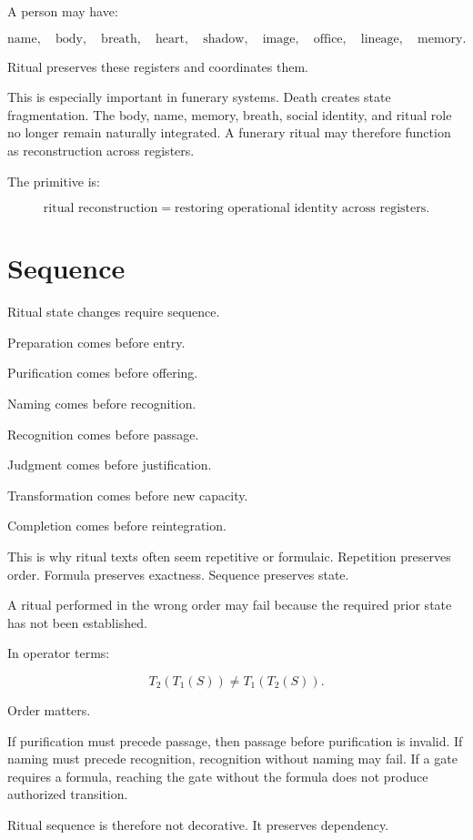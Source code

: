 \documentclass[11pt]{book}
\begin{document}
A person may have:

\[
\text{name},
\quad
\text{body},
\quad
\text{breath},
\quad
\text{heart},
\quad
\text{shadow},
\quad
\text{image},
\quad
\text{office},
\quad
\text{lineage},
\quad
\text{memory}.
\]

Ritual preserves these registers and coordinates them.

This is especially important in funerary systems. Death creates state fragmentation. The body, name, memory, breath, social identity, and ritual role no longer remain naturally integrated. A funerary ritual may therefore function as reconstruction across registers.

The primitive is:

\[
\text{ritual reconstruction} = \text{restoring operational identity across registers}.
\]

\section{Sequence}

Ritual state changes require sequence.

Preparation comes before entry.

Purification comes before offering.

Naming comes before recognition.

Recognition comes before passage.

Judgment comes before justification.

Transformation comes before new capacity.

Completion comes before reintegration.

This is why ritual texts often seem repetitive or formulaic. Repetition preserves order. Formula preserves exactness. Sequence preserves state.

A ritual performed in the wrong order may fail because the required prior state has not been established.

In operator terms:

\[
T_2(T_1(S)) \neq T_1(T_2(S)).
\]

Order matters.

If purification must precede passage, then passage before purification is invalid. If naming must precede recognition, recognition without naming may fail. If a gate requires a formula, reaching the gate without the formula does not produce authorized transition.

Ritual sequence is therefore not decorative. It preserves dependency.
\end{document}
